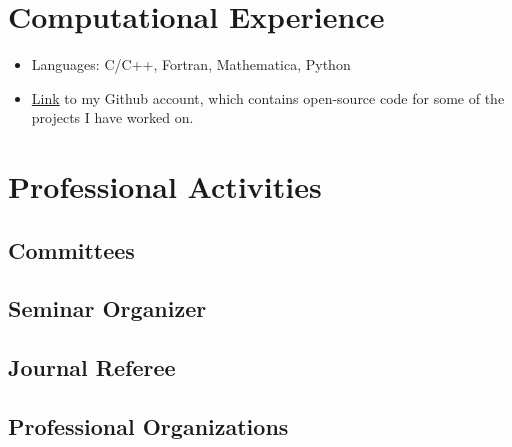 \documentclass{my_cv}
\begin{document}
\section{Computational Experience}
\begin{itemize}
\item Languages: C/C++, Fortran, Mathematica, Python 
\item \href{https://github.com/JLRipley314}{Link} to
      my Github account, which contains open-source code for
      some of the projects I have worked on.
\end{itemize}
\section{Professional Activities}
\subsection{Committees}
\begin{itemize}
\end{itemize}
\subsection{Seminar Organizer}
\begin{itemize}
\end{itemize}
\subsection{Journal Referee}
\begin{itemize}
\end{itemize}
\subsection{Professional Organizations}
\begin{itemize}
\end{itemize}
\end{document}
